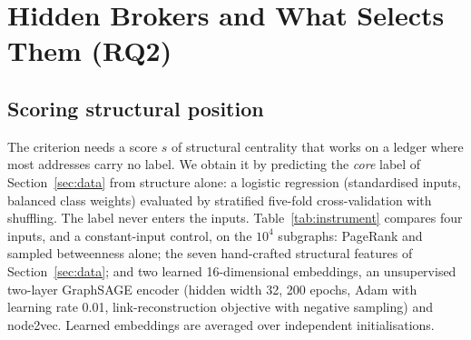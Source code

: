 \section{Hidden Brokers and What Selects Them (RQ2)}
\label{sec:brokers}

\subsection{Scoring structural position}
\label{sec:instrument}
The criterion needs a score $s$ of structural centrality that works on a
ledger where most addresses carry no label. We obtain it by predicting the
\emph{core} label of Section~\ref{sec:data} from structure alone: a logistic
regression (standardised inputs, balanced class weights) evaluated by
stratified five-fold cross-validation with shuffling. The label never enters
the inputs. Table~\ref{tab:instrument} compares four inputs, and a constant-input control, on the $10^{4}$
subgraphs: PageRank and sampled betweenness alone; the seven hand-crafted
structural features of Section~\ref{sec:data}; and two learned
16-dimensional embeddings, an unsupervised two-layer GraphSAGE encoder
\cite{hamilton2017inductive} (hidden width 32, 200 epochs, Adam with learning
rate 0.01, link-reconstruction objective with negative sampling) and
node2vec. Learned embeddings are averaged over independent initialisations.

